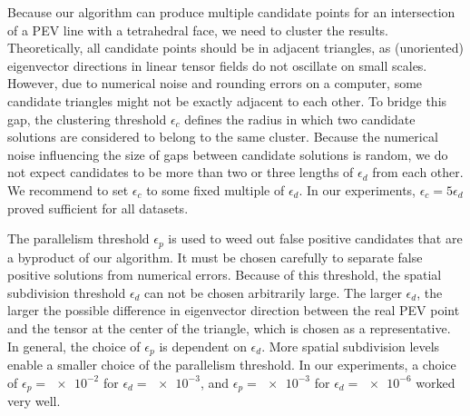 %
Because our algorithm can produce multiple candidate points for an intersection
of a \ac{PEV} line with a tetrahedral face, we need to cluster the results.
%
Theoretically, all candidate points should be in adjacent triangles, as
(unoriented) eigenvector directions in linear tensor fields do not oscillate
on small scales.
%
However, due to numerical noise and rounding errors on a computer, some
candidate triangles might not be exactly adjacent to each other.
%
To bridge this gap, the clustering threshold $\epsilon_c$ defines the radius in
which two candidate solutions are considered to belong to the same cluster.
%
Because the numerical noise influencing the size of gaps between candidate
solutions is random, we do not expect candidates to be more than two or three
lengths of $\epsilon_d$ from each other.
%
We recommend to set $\epsilon_c$ to some fixed multiple of $\epsilon_d$.
%
In our experiments, $\epsilon_c = 5 \epsilon_d$ proved sufficient for all
datasets.
%

%
The parallelism threshold $\epsilon_p$ is used to weed out false positive
candidates that are a byproduct of our algorithm.
%
It must be chosen carefully to separate false positive solutions from numerical
errors.
%
Because of this threshold, the spatial subdivision threshold $\epsilon_d$ can
not be chosen arbitrarily large.
%
The larger $\epsilon_d$, the larger the possible difference in eigenvector
direction between the real \ac{PEV} point and the tensor at the center of the
triangle, which is chosen as a representative.
%
In general, the choice of $\epsilon_p$ is dependent on $\epsilon_d$.
%
More spatial subdivision levels enable a smaller choice of the parallelism
threshold.
%
In our experiments, a choice of $\epsilon_p = \num{e-2}$ for $\epsilon_d =
\num{e-3}$, and $\epsilon_p = \num{e-3}$ for $\epsilon_d = \num{e-6}$ worked
very well.
%